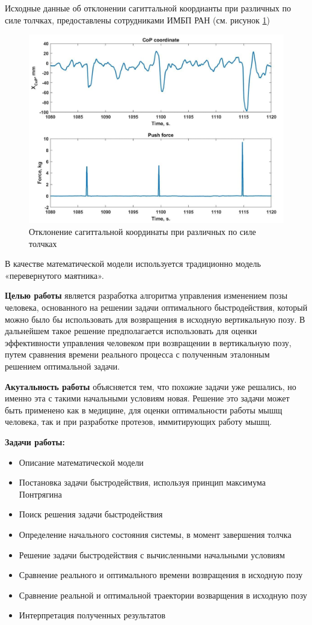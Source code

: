 \documentclass[a4paper,12pt, openany]{book}
\theoremstyle{plain} %
\theoremstyle{definition} %
\theoremstyle{remark} %
\numberwithin{equation}{chapter}
\begin{document}
{Исходные данные об отклонении сагиттальной коордианты при различных по силе толчках, предоставлены сотрудниками ИМБП РАН (см. рисунок \ref{fig:pushes})
\begin{figure}[h!]
    \centering
    \includegraphics[width=0.9\linewidth]{Pushes.png}
    \caption{Отклонение сагиттальной координаты при различных по силе толчках}
    \label{fig:pushes}
\end{figure}
В качестве математической модели
используется традиционно модель «перевернутого маятника»\cite{PAKrychinin,kasatkin,gurfincel}. 


\textbf{Целью работы} является разработка алгоритма управления изменением позы человека, основанного на решении задачи оптимального быстродействия,
который можно было бы использовать для возвращения в исходную вертикальную позу. В дальнейшем
такое решение предполагается использовать для оценки эффективности управления человеком
при возвращении в вертикальную позу, путем сравнения
времени реального процесса с полученным эталонным решением оптимальной задачи.

\textbf{Акутальность работы} объясняется тем, что похожие задачи уже решались, но именно эта с такими начальными условиям новая.
Решение это задачи может быть применено как в медицине, для оценки оптимальности работы мышщ человека, так и при разработке протезов, иммитирующих работу мышщ.

\textbf{Задачи работы: }
\begin{itemize} 
    \item Описание математической модели
    \item Постановка задачи быстродействия, используя принцип максимума Понтрягина
    \item Поиск решения задачи быстродействия
    \item Определение начального состояния системы, в момент завершения толчка
    \item Решение задачи быстродействия с вычисленными начальными условиям
    \item Сравнение реального и оптимального времени возвращения в исходную позу
    \item Сравнение реальной и оптимальной траектории возварщения в исходную позу
    \item Интерпретация полученных результатов
\end{itemize} 

}
\end{document}
